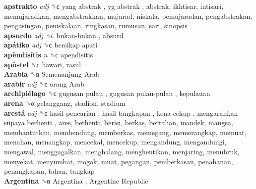 \textbf{apstrakto} \emph{adj}  ␝ϲ   yang abstrak ,  yg abstrak , abstrak, ikhtisar, intisari, memujaradkan, mengabstrakkan, mujarad, niskala, pemujaradan, pengabstrakan, pengasingan, peniskalaan, ringkasan, rumusan, sari, sinopsis  \\
\textbf{apsurdo} \emph{adj}  ␝ϲ   bukan-bukan , absurd  \\
\textbf{apátiko} \emph{adj}  ␝ϲ   bersikap apati   \\
\textbf{apèndisítis} \emph{n}  ␝ϲ  apendisitis  \\
\textbf{apòstel} ␝ϲ  hawari, rasul  \\
\textbf{Arabia} ␝α   Semenanjung Arab   \\
\textbf{arabir} \emph{adj}  ␝ϲ   orang Arab   \\
\textbf{archipiélago} ␝ϲ   gugusan pulau ,  gugusan pulau-pulau , kepulauan  \\
\textbf{arena} ␝α  gelanggang, stadion, stadium  \\
\textbf{arestá} \emph{adj}  ␝ϲ   hasil pencarian ,  hasil tangkapan ,  kena cekup ,  mengarahkan supaya berhenti , ares, berhenti, berisi, berkas, bertahan, mandek, mangsa, membantutkan, membendung, memberkas, memegang, memerangkap, memuat, menahan, menangkap, mencekal, mencekup, mengandung, mengandungi, mengawal, menggagalkan, menghalang, menghentikan, menjaring, menubruk, menyekat, menyumbat, mogok, muat, pegangan, pemberkasan, penahanan, penangkapan, tahan, tangkap  \\
\textbf{Argentina} ␝α   Argentina ,  Argentine Republic   \\
